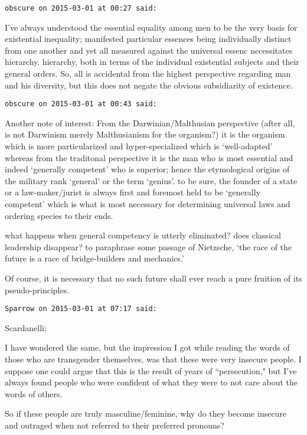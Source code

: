 \begin{footnotesize}
\begin{sffamily}
\hfill

\texttt{obscure on 2015-03-01 at 00:27 said: }

I've always understood the essential equality among men to be the very basis for existential inequality; manifested particular essences being individually distinct from one another and yet all measured against the universal essenc necessitates hierarchy. hierarchy, both in terms of the individual existential subjects and their general orders. So, all is accidental from the highest perspective regarding man and his diversity, but this does not negate the obvious subsidiarity of existence.


\hfill

\texttt{obscure on 2015-03-01 at 00:43 said: }

Another note of interest: From the Darwinian/Malthusian perspective (after all, is not Darwinism merely Malthusianism for the organism?) it is the organism which is more particularized and hyper-specialized which is `well-adapted' whereas from the traditonal perspective it is the man who is most essential and indeed `generally competent' who is superior; hence the etymological origins of the military rank `general' or the term `genius'. to be sure, the founder of a state or a law-maker/jurist is always first and foremost held to be `generally competent' which is what is most necessary for determining universal laws and ordering species to their ends. 

what happens when general competency is utterly eliminated? does classical leadership disappear? to paraphrase some passage of Nietzsche, `the race of the future is a race of bridge-builders and mechanics.'

Of course, it is necessary that no such future shall ever reach a pure fruition of its pseudo-principles.


\hfill

\texttt{Sparrow on 2015-03-01 at 07:17 said: }

Scardanelli;

I have wondered the same, but the impression I got while reading the words of those who are transgender themselves, was that these were very insecure people. I suppose one could argue that this is the result of years of ``persecution," but I've always found people who were confident of what they were to not care about the words of others.

So if these people are truly masculine/feminine, why do they become insecure and outraged when not referred to their preferred pronouns?


\end{sffamily}
\end{footnotesize}
